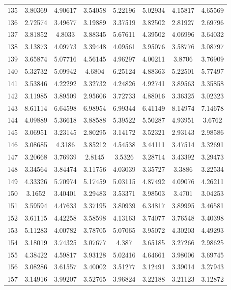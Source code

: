 \begin{figure}
\begin{tabular}{cccccccc}
135 & 3.80369 & 4.90617 & 3.54058 & 5.22196 & 5.02934 & 4.15817 & 4.65569\\
136 & 2.72574 & 3.49677 & 3.19889 & 3.37519 & 3.82502 & 2.81927 & 2.69796\\
137 & 3.81852 & 4.8033 & 3.88345 & 5.67611 & 4.39502 & 4.06996 & 3.64032\\
138 & 3.13873 & 4.09773 & 3.39448 & 4.09561 & 3.95076 & 3.58776 & 3.08797\\
139 & 3.65874 & 5.07716 & 4.56145 & 4.96297 & 4.00211 & 3.8706 & 3.76909\\
140 & 5.32732 & 5.09942 & 4.6804 & 6.25124 & 4.88363 & 5.22501 & 5.77497\\
141 & 3.53846 & 4.22292 & 3.32732 & 4.24826 & 4.92741 & 3.89563 & 3.35858\\
142 & 3.11985 & 3.89509 & 2.95606 & 3.72733 & 4.88016 & 3.36325 & 3.02323\\
143 & 8.61114 & 6.64598 & 6.98954 & 6.99344 & 6.41149 & 8.14974 & 7.14678\\
144 & 4.09889 & 5.36618 & 3.88588 & 5.39522 & 5.50287 & 4.93951 & 3.6762\\
145 & 3.06951 & 3.23145 & 2.80295 & 3.14172 & 3.52321 & 2.93143 & 2.98586\\
146 & 3.08685 & 4.3186 & 3.85212 & 4.54538 & 3.44111 & 3.47514 & 3.32691\\
147 & 3.20668 & 3.76939 & 2.8145 & 3.5326 & 3.28714 & 3.43392 & 3.29473\\
148 & 3.34564 & 3.84474 & 3.11756 & 4.03039 & 3.35727 & 3.3886 & 3.22534\\
149 & 4.33326 & 5.70974 & 5.17459 & 5.03115 & 4.87492 & 4.09076 & 4.26211\\
150 & 3.1652 & 3.40401 & 3.29483 & 3.53371 & 3.98503 & 3.4701 & 3.04253\\
151 & 3.59594 & 4.47633 & 3.37195 & 3.80939 & 6.34817 & 3.89995 & 3.46581\\
152 & 3.61115 & 4.42258 & 3.58598 & 4.13163 & 3.74077 & 3.76548 & 3.40398\\
153 & 5.11283 & 4.00782 & 3.78705 & 5.07065 & 3.95072 & 4.30203 & 4.49293\\
154 & 3.18019 & 3.74325 & 3.07677 & 4.387 & 3.65185 & 3.27266 & 2.98625\\
155 & 4.38422 & 4.59817 & 3.93128 & 5.02416 & 4.64661 & 3.98006 & 3.69745\\
156 & 3.08286 & 3.61557 & 3.40002 & 3.51277 & 3.12491 & 3.39014 & 3.27943\\
157 & 3.14916 & 3.99207 & 3.52765 & 3.96824 & 3.22188 & 3.21123 & 3.12872\\

\end{tabular}
\end{figure}
